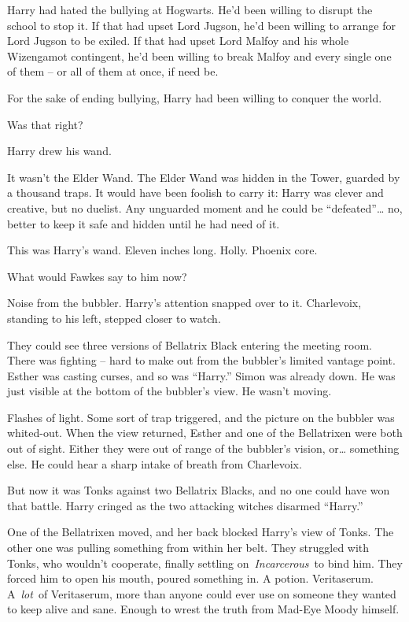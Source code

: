 Harry had hated the bullying at Hogwarts. He'd been willing to disrupt
the school to stop it. If that had upset Lord Jugson, he'd been willing
to arrange for Lord Jugson to be exiled. If that had upset Lord Malfoy
and his whole Wizengamot contingent, he'd been willing to break Malfoy
and every single one of them -- or all of them at once, if need be.

For the sake of ending bullying, Harry had been willing to conquer the
world.

Was that right?

Harry drew his wand.

It wasn't the Elder Wand. The Elder Wand was hidden in the Tower,
guarded by a thousand traps. It would have been foolish to carry it:
Harry was clever and creative, but no duelist. Any unguarded moment and
he could be ``defeated''\ldots{} no, better to keep it safe and hidden
until he had need of it.

This was Harry's wand. Eleven inches long. Holly. Phoenix core.

What would Fawkes say to him now?

Noise from the bubbler. Harry's attention snapped over to it.
Charlevoix, standing to his left, stepped closer to watch.

They could see three versions of Bellatrix Black entering the meeting
room. There was fighting -- hard to make out from the bubbler's limited
vantage point. Esther was casting curses, and so was ``Harry.'' Simon
was already down. He was just visible at the bottom of the bubbler's
view. He wasn't moving.

Flashes of light. Some sort of trap triggered, and the picture on the
bubbler was whited-out. When the view returned, Esther and one of the
Bellatrixen were both out of sight. Either they were out of range of the
bubbler's vision, or\ldots{} something else. He could hear a sharp
intake of breath from Charlevoix.

But now it was Tonks against two Bellatrix Blacks, and no one could have
won that battle. Harry cringed as the two attacking witches disarmed
``Harry.''

One of the Bellatrixen moved, and her back blocked Harry's view of
Tonks. The other one was pulling something from within her belt. They
struggled with Tonks, who wouldn't cooperate, finally settling
on~\emph{Incarcerous}~to bind him. They forced him to open his mouth,
poured something in. A potion. Veritaserum. A~\emph{lot}~of Veritaserum,
more than anyone could ever use on someone they wanted to keep alive and
sane. Enough to wrest the truth from Mad-Eye Moody himself.

